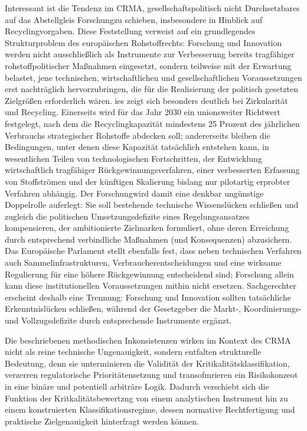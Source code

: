 \documentclass[12pt,a4paper,oneside]{book} %
\begin{document}
Interessant ist die Tendenz im CRMA, \glqq gesellschaftspolitisch nicht Durchsetzbares auf das Abstellgleis \glq Forschung\grq \grqq zu schieben, insbesondere in Hinblick auf Recyclingvorgaben. Diese Feststellung verweist auf ein grundlegendes Strukturproblem des europäischen Rohstoffrechts: Forschung und Innovation werden nicht ausschließlich als Instrumente zur Verbesserung bereits tragfähiger rohstoffpolitischer Maßnahmen eingesetzt, sondern teilweise mit der Erwartung belastet, jene technischen, wirtschaftlichen und gesellschaftlichen Voraussetzungen erst nachträglich hervorzubringen, die für die Realisierung der politisch gesetzten Zielgrößen erforderlich wären. ies zeigt sich besonders deutlich bei Zirkularität und Recycling. Einerseits wird für das Jahr 2030 ein unionsweiter Richtwert festgelegt, nach dem die Recyclingkapazität mindestens 25 Prozent des jährlichen Verbrauchs strategischer Rohstoffe abdecken soll; andererseits bleiben die Bedingungen, unter denen diese Kapazität tatsächlich entstehen kann, in wesentlichen Teilen von technologischen Fortschritten, der Entwicklung wirtschaftlich tragfähiger Rückgewinnungsverfahren, einer verbesserten Erfassung von Stoffströmen und der künftigen Skalierung bislang nur pilotartig erprobter Verfahren abhängig. Der \glqq Forschung\grqq wird damit eine denkbar ungünstige Doppelrolle auferlegt: Sie soll bestehende technische Wissenslücken schließen und zugleich die politischen Umsetzungsdefizite eines Regelungsansatzes kompensieren, der ambitionierte Zielmarken formuliert, ohne deren Erreichung durch entsprechend verbindliche Maßnahmen (und Konsequenzen) abzusichern. Das Europäische Parlament stellt ebenfalls fest, dass neben technischen Verfahren auch Sammelinfrastrukturen, Verbraucherentscheidungen und eine wirksame Regulierung für eine höhere Rückgewinnung entscheidend sind; Forschung allein kann diese institutionellen Voraussetzungen mithin nicht ersetzen.\autocite{The role of research and innovation in ensuring a safe and sustainable supply of critical raw materials in the EU} Sachgerechter erscheint deshalb eine Trennung: Forschung und Innovation sollten tatsächliche Erkenntnislücken schließen, während der Gesetzgeber die Markt-, Koordinierungs- und Vollzugsdefizite durch entsprechende Instrumente ergänzt.

Die beschriebenen methodischen Inkonsistenzen wirken im Kontext des CRMA nicht als reine technische Ungenauigkeit, sondern entfalten strukturelle Bedeutung, denn sie unterminieren die Validität der Kritikalitätsklassifikation, verzerren regulatorische Prioritätensetzung und transofmrieren ein Risikokonzeot in eine binäre und potentiell arbiträre Logik. Dadurch verschiebt sich die Funktion der Kritkalitätsbewertzng von einem analytischen Instrument hin zu einem konstruierten Klassifikationsregime, dessen normative Rechtfertigung und praktische Zielgenauigkeit hinterfragt werden können.
\end{document}

